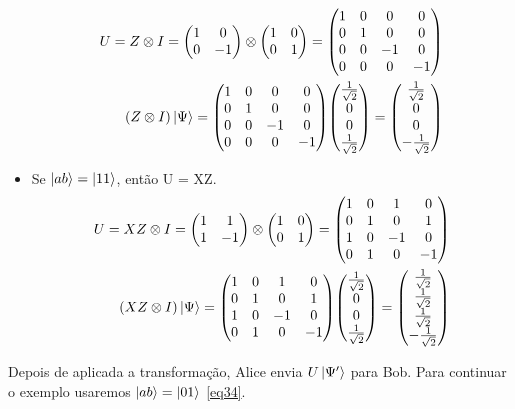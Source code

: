 \documentclass[a4paper, 12pt, oneside]{book}
\begin{document}
\begin{itemize}
\begin{align*}
U = Z\otimes I = \mqty(1&0\\0&-1)\otimes\mqty(1&0\\0&1) = 
	\mqty(1&0&0&0\\0&1&0&0\\0&0&-1&0\\0&0&0&-1) \\
(Z\otimes I)\ket{\Psi} =  \mqty(1&0&0&0\\0&1&0&0\\0&0&-1&0\\0&0&0&-1) 
	\mqty(\frac{1}{\sqrt{2}}\\0\\ 0\\ \frac{1}{\sqrt{2}}) 
	= \mqty(\frac{1}{\sqrt{2}}\\0\\ 0\\ -\frac{1}{\sqrt{2}}) 
\end{align*}
\item Se $\ket{ab}=\ket{11}$, então U = XZ.
\begin{align*}
U = XZ\otimes I = \mqty(1&1\\1&-1)\otimes\mqty(1&0\\0&1) = 
	\mqty(1&0&1&0\\0&1&0&1\\1&0&-1&0\\0&1&0&-1) \\
(XZ\otimes I)\ket{\Psi} =  \mqty(1&0&1&0\\0&1&0&1\\1&0&-1&0\\0&1&0&-1)
	\mqty(\frac{1}{\sqrt{2}}\\0\\ 0\\ \frac{1}{\sqrt{2}}) 
	= \mqty(\frac{1}{\sqrt{2}}\\ \frac{1}{\sqrt{2}}\\ \frac{1}{\sqrt{2}}\\ -\frac{1}{\sqrt{2}}) 
\end{align*}
\end{itemize}
Depois de aplicada a transformação, Alice envia $U\ket{\Psi'}$ para Bob. Para continuar o exemplo usaremos $\ket{ab}=\ket{01}$ \eqref{eq34}.
\end{document}
